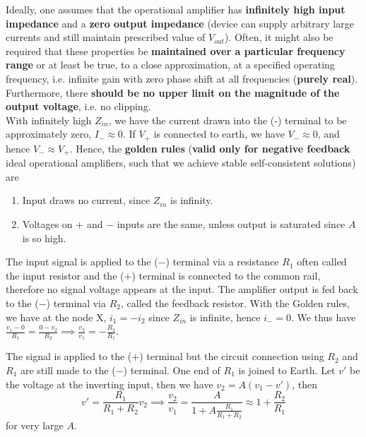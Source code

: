 \documentclass[a4paper]{article}
\begin{document}
\begin{Note}
Ideally, one assumes that the operational amplifier has \textbf{infinitely high input impedance} and a \textbf{zero output impedance} (device can supply arbitrary large currents and still maintain prescribed value of $V_{out}$). Often, it might also be required that these properties be \textbf{maintained over a particular frequency range} or at least be true, to a close approximation, at a specified operating frequency, i.e. infinite gain with zero phase shift at all frequencies (\textbf{purely real}). Furthermore, there \textbf{should be no upper limit on the magnitude of the output voltage}, i.e. no clipping.\\[5pt]
With infinitely high $Z_{in}$, we have the current drawn into the (-) terminal to be approximately zero, $I_-\approx 0$. If $V_+$ is connected to earth, we have $V_-\approx 0$, and hence $V_-\approx V_+$. Hence, the \textbf{golden rules} (\textbf{valid only for negative feedback} ideal operational amplifiers, such that we achieve stable self-consistent solutions) are
\begin{enumerate}
    \item Input draws no current, since $Z_{in}$ is infinity.
    \item Voltages on $+$ and $-$ inputs are the same, unless output is saturated since $A$ is so high.
\end{enumerate}
\end{Note}
\begin{eg}
The input signal is applied to the ($-$) terminal via a resistance $R_1$ often called the input resistor and the ($+$) terminal is connected to the common rail, therefore no signal voltage appears at the input. The amplifier output is fed back to the ($-$) terminal via $R_2$, called the feedback resistor. With the Golden rules, we have at the node X, $i_1=-i_2$ since $Z_{in}$ is infinite, hence $i_-=0$. We thus have $\frac{v_1-0}{R_1}=\frac{0-v_2}{R_2}\implies\frac{v_2}{v_1}=-\frac{R_2}{R_1}$.
\end{eg}
\begin{eg}
The signal is applied to the ($+$) terminal but the circuit connection using $R_2$ and $R_1$ are still made to the ($-$) terminal. One end of $R_1$ is joined to Earth. Let $v'$ be the voltage at the inverting input, then we have $v_2=A(v_1-v')$, then
$$v'=\frac{R_1}{R_1+R_2}v_2\implies\frac{v_2}{v_1}=\frac{A}{1+A\frac{R_1}{R_1+R_2}}\approx1+\frac{R_2}{R_1}$$
for very large $A$.
\end{eg}
\end{document}
